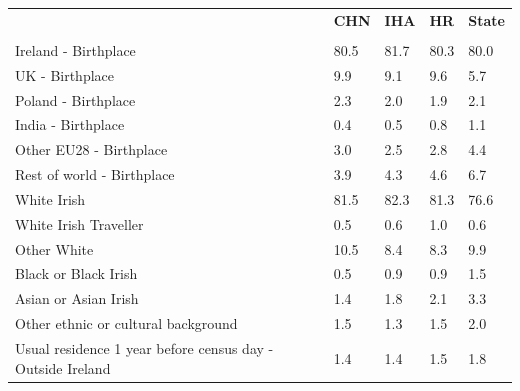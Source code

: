 \documentclass{article}
\begin{document}
\pagebreak
\begin{table}[h]	
\centering
		\begin{tabular}{KTTTT}
  \hline
& \textbf{CHN} & \textbf{IHA} & \textbf{HR}& \textbf{State}\\ 
  \hline
    \\ 
    \hline
Ireland - Birthplace & 80.5& 81.7& 80.3& 80.0\\
UK - Birthplace & 9.9& 9.1& 9.6& 5.7\\
Poland - Birthplace & 2.3& 2.0& 1.9& 2.1\\
India - Birthplace & 0.4& 0.5& 0.8& 1.1\\
Other EU28 - Birthplace & 3.0& 2.5& 2.8& 4.4\\
Rest of world - Birthplace & 3.9& 4.3& 4.6& 6.7\\
    \hline
White Irish & 81.5& 82.3& 81.3& 76.6\\
White Irish Traveller & 0.5& 0.6& 1.0& 0.6\\
Other White & 10.5&  8.4&  8.3&  9.9\\
Black or Black Irish & 0.5& 0.9& 0.9& 1.5\\
Asian or Asian Irish & 1.4& 1.8& 2.1& 3.3\\
Other ethnic or cultural background & 1.5& 1.3& 1.5& 2.0\\
    \hline
Usual residence 1 year before census day - Outside Ireland & 1.4& 1.4& 1.5& 1.8\\


\end{tabular}
\end{table}
\end{document}
